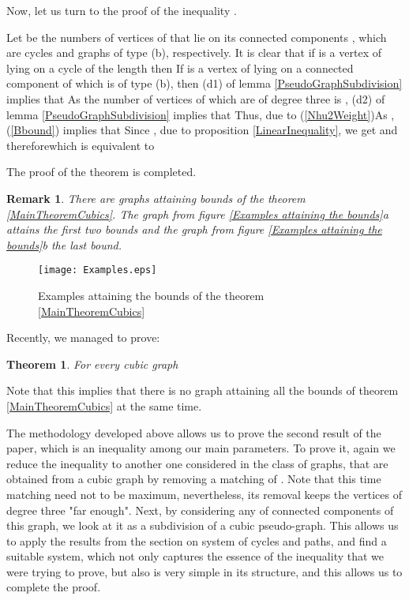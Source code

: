 \documentclass[fleqn,12pt,twoside]{article}
\newtheorem{theorem}{Theorem}
\newtheorem{remark}{Remark}
\newenvironment{proof}[1][Proof.]{\begin{trivlist}
\item[\hskip \labelsep {\bfseries #1}]}{\end{trivlist}}
\begin{document}
\begin{proof}
Now, let us turn to the proof of the inequality .

Let  be the numbers of vertices of  that lie on
its connected components , which are cycles and
graphs of type (b), respectively. It is clear that if  is a
vertex of  lying on a cycle of the length  then
If  is a vertex of  lying on a connected component  of  which is of type (b), then (d1) of lemma \ref {PseudoGraphSubdivision} implies that
As the number of vertices of  which are of degree three is , (d2) of lemma \ref {PseudoGraphSubdivision} implies that
Thus, due to (\ref{Nhu2Weight})As , (\ref{Bbound}) implies that
Since , due to proposition
\ref{LinearInequality}, we get
and thereforewhich is equivalent to

The proof of the theorem is completed.
\end{proof}

\begin{remark}
There are graphs attaining bounds of the theorem
\ref{MainTheoremCubics}. The graph from figure \ref{Examples
attaining the bounds}a attains the first two bounds and the graph
from figure \ref{Examples attaining the bounds}b the last bound.
\end{remark}

\begin{center}
\begin{figure}[h]
\begin{center}
\texttt{[image: Examples.eps]}\\
\caption{Examples attaining the bounds of the theorem
\protect\ref{MainTheoremCubics}}\label{Examples attaining the
bounds}
\end{center}
\end{figure}
\end{center}

Recently, we managed to prove:

\begin{theorem}
For every cubic graph 
\end{theorem}

Note that this implies that there is no graph attaining
all the bounds of theorem \ref{MainTheoremCubics} at the same time.

The methodology developed above allows us to prove the second result
of the paper, which is an inequality among our main parameters. To
prove it, again we reduce the inequality to another one considered
in the class of graphs, that are obtained from a cubic graph by
removing a matching of . Note that this time matching need not to
be maximum, nevertheless, its removal keeps the vertices of degree
three "far enough". Next, by considering any of connected components
of this graph, we look at it as a subdivision of a cubic
pseudo-graph. This allows us to apply the results from the section
on system of cycles and paths, and find a suitable system, which not
only captures the essence of the inequality that we were trying to
prove, but also is very simple in its structure, and this allows us
to complete the proof.
\end{document}
